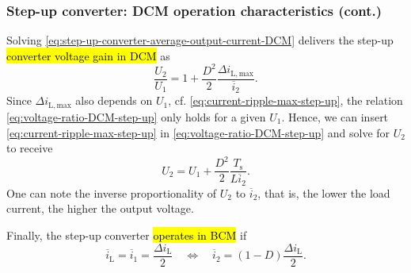 \begin{frame}
    \frametitle{Step-up converter: DCM operation characteristics (cont.)}
    Solving \eqref{eq:step-up-converter-average-output-current-DCM} delivers the step-up \hl{converter voltage gain in DCM} as
    \begin{equation}
        \frac{U_2}{U_1} = 1+ \frac{D^2}{2} \frac{\Delta i_\mathrm{L,max}}{\overline{i}_2}.
        \label{eq:voltage-ratio-DCM-step-up}
    \end{equation}
    Since $\Delta i_\mathrm{L,max}$ also depends on $U_1$, cf.  \eqref{eq:current-ripple-max-step-up}, the relation \eqref{eq:voltage-ratio-DCM-step-up} only holds for a given $U_1$. Hence, we can insert \eqref{eq:current-ripple-max-step-up} in \eqref{eq:voltage-ratio-DCM-step-up} and solve for $U_2$ to receive
    \begin{equation}
        U_2= U_1 + \frac{D^2}{2} \frac{T_\mathrm{s}}{L \overline{i}_2}.
    \end{equation}
    One can note the inverse proportionality of $U_2$ to $\overline{i}_2$, that is, the lower the load current, the higher the output voltage.

    Finally, the step-up converter \hl{operates in BCM} if
    \begin{equation}
        \overline{i}_\mathrm{L}=\overline{i}_1 = \frac{\Delta i_\mathrm{L}}{2} \quad \Leftrightarrow \quad  \overline{i}_2 = (1-D)\frac{\Delta i_\mathrm{L}}{2}. 
    \end{equation}
\end{frame}

